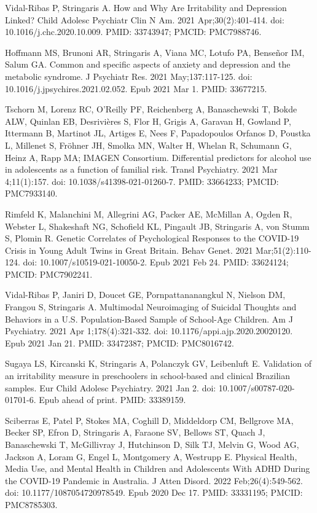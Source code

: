 \documentclass[
]{article}
\begin{document}
Vidal-Ribas P, Stringaris A. How and Why Are Irritability and Depression
Linked? Child Adolesc Psychiatr Clin N Am. 2021 Apr;30(2):401-414. doi:
10.1016/j.chc.2020.10.009. PMID: 33743947; PMCID: PMC7988746.

Hoffmann MS, Brunoni AR, Stringaris A, Viana MC, Lotufo PA, Benseñor IM,
Salum GA. Common and specific aspects of anxiety and depression and the
metabolic syndrome. J Psychiatr Res. 2021 May;137:117-125. doi:
10.1016/j.jpsychires.2021.02.052. Epub 2021 Mar 1. PMID: 33677215.

Tschorn M, Lorenz RC, O'Reilly PF, Reichenberg A, Banaschewski T, Bokde
ALW, Quinlan EB, Desrivières S, Flor H, Grigis A, Garavan H, Gowland P,
Ittermann B, Martinot JL, Artiges E, Nees F, Papadopoulos Orfanos D,
Poustka L, Millenet S, Fröhner JH, Smolka MN, Walter H, Whelan R,
Schumann G, Heinz A, Rapp MA; IMAGEN Consortium. Differential predictors
for alcohol use in adolescents as a function of familial risk. Transl
Psychiatry. 2021 Mar 4;11(1):157. doi: 10.1038/s41398-021-01260-7. PMID:
33664233; PMCID: PMC7933140.

Rimfeld K, Malanchini M, Allegrini AG, Packer AE, McMillan A, Ogden R,
Webster L, Shakeshaft NG, Schofield KL, Pingault JB, Stringaris A, von
Stumm S, Plomin R. Genetic Correlates of Psychological Responses to the
COVID-19 Crisis in Young Adult Twins in Great Britain. Behav Genet. 2021
Mar;51(2):110-124. doi: 10.1007/s10519-021-10050-2. Epub 2021 Feb 24.
PMID: 33624124; PMCID: PMC7902241.

Vidal-Ribas P, Janiri D, Doucet GE, Pornpattananangkul N, Nielson DM,
Frangou S, Stringaris A. Multimodal Neuroimaging of Suicidal Thoughts
and Behaviors in a U.S. Population-Based Sample of School-Age Children.
Am J Psychiatry. 2021 Apr 1;178(4):321-332. doi:
10.1176/appi.ajp.2020.20020120. Epub 2021 Jan 21. PMID: 33472387; PMCID:
PMC8016742.

Sugaya LS, Kircanski K, Stringaris A, Polanczyk GV, Leibenluft E.
Validation of an irritability measure in preschoolers in school-based
and clinical Brazilian samples. Eur Child Adolesc Psychiatry. 2021 Jan
2. doi: 10.1007/s00787-020-01701-6. Epub ahead of print. PMID: 33389159.

Sciberras E, Patel P, Stokes MA, Coghill D, Middeldorp CM, Bellgrove MA,
Becker SP, Efron D, Stringaris A, Faraone SV, Bellows ST, Quach J,
Banaschewski T, McGillivray J, Hutchinson D, Silk TJ, Melvin G, Wood AG,
Jackson A, Loram G, Engel L, Montgomery A, Westrupp E. Physical Health,
Media Use, and Mental Health in Children and Adolescents With ADHD
During the COVID-19 Pandemic in Australia. J Atten Disord. 2022
Feb;26(4):549-562. doi: 10.1177/1087054720978549. Epub 2020 Dec 17.
PMID: 33331195; PMCID: PMC8785303.
\end{document}
